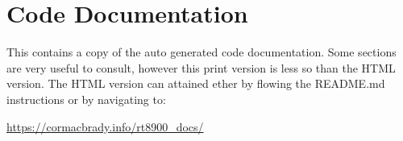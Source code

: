 \chapter{Code Documentation}
This contains a copy of the auto generated code documentation. Some sections are very useful to consult, however this print version is less so than the HTML version. The HTML version can attained ether by flowing the README.md instructions or by navigating to:

\url{https://cormacbrady.info/rt8900_docs/}


